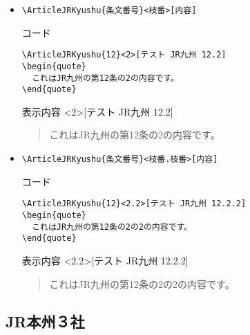 \documentclass[oneside,10pt,a4paper]{jsarticle}
\begin{document}
\begin{itemize}
    \item \verb|\ArticleJRKyushu{条文番号}<枝番>[内容]|
      \begin{itembox}[l]{コード}
        {\footnotesize\begin{verbatim}
\ArticleJRKyushu{12}<2>[テスト JR九州 12.2]
\begin{quote}
  これはJR九州の第12条の2の内容です。
\end{quote}\end{verbatim}}
      \end{itembox}
      \begin{itembox}[l]{表示内容}
        <2>[テスト JR九州 12.2]
        \begin{quote}
          これはJR九州の第12条の2の内容です。
        \end{quote}
      \end{itembox}
    \item \verb|\ArticleJRKyushu{条文番号}<枝番.枝番>[内容]|
      \begin{itembox}[l]{コード}
        {\footnotesize\begin{verbatim}
\ArticleJRKyushu{12}<2.2>[テスト JR九州 12.2.2]
\begin{quote}
  これはJR九州の第12条の2の2の内容です。
\end{quote}\end{verbatim}}
      \end{itembox}
      \begin{itembox}[l]{表示内容}
        <2.2>[テスト JR九州 12.2.2]
        \begin{quote}
          これはJR九州の第12条の2の2の内容です。
        \end{quote}
      \end{itembox}
  \end{itemize}

  \newpage

  \subsection{JR本州３社}
\end{document}
